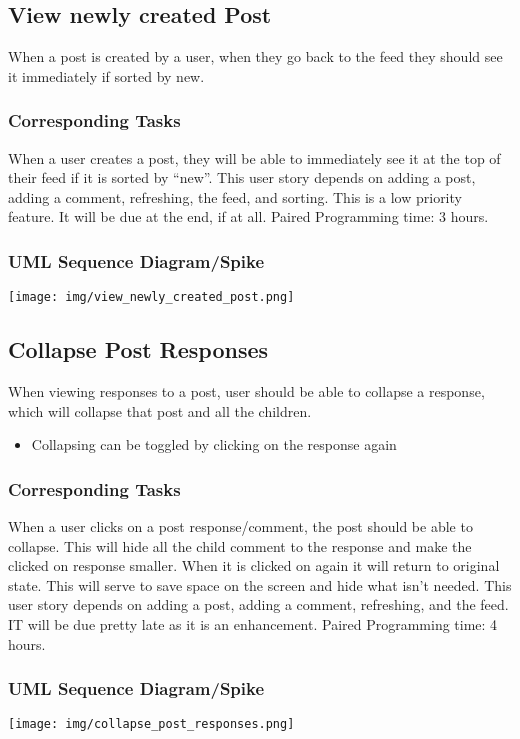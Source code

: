 \documentclass[12pt]{article}
\begin{document}
\subsection{View newly created Post}
When a post is created by a user, when they go back to the feed they should see
it immediately if sorted by new.
\subsubsection{Corresponding Tasks}
	When a user creates a post, they will be able to immediately see it at the top of their feed if it is sorted by “new”.  This user story depends on adding a post, adding a comment, refreshing, the feed, and sorting.  This is a low priority feature.  It will be due at the end, if at all.  Paired Programming time: 3 hours.
\subsubsection{UML Sequence Diagram/Spike}
\texttt{[image: img/view\_newly\_created\_post.png]}\linebreak

\subsection{Collapse Post Responses}
When viewing responses to a post, user should be able to collapse a response,
which will collapse that post and all the children.
\begin{itemize}
  \item Collapsing can be toggled by clicking on the response again
\end{itemize}
\subsubsection{Corresponding Tasks}
	When a user clicks on a post response/comment, the post should be able to collapse.  This will hide all the child comment to the response and make the clicked on response smaller.  When it is clicked on again it will return to original state.  This will serve to save space on the screen and hide what isn’t needed.  This user story depends on adding a post, adding a comment, refreshing, and the feed.  IT will be due pretty late as it is an enhancement.  Paired Programming time: 4 hours.
\subsubsection{UML Sequence Diagram/Spike}
\texttt{[image: img/collapse\_post\_responses.png]}\linebreak
\end{document}
